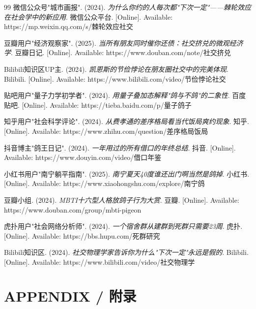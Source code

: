\documentclass[journal]{IEEEtran}
\begin{document}
\begin{thebibliography}{99}
 微信公众号"城市画报". (2024). \textit{为什么你约的人每次都"下次一定"——棘轮效应在社会学中的新应用}. 微信公众平台. [Online]. Available: https://mp.weixin.qq.com/s/棘轮效应社交

 豆瓣用户"经济观察家". (2025). \textit{当所有朋友同时催你还债：社交挤兑的微观经济学}. 豆瓣日记. [Online]. Available: https://www.douban.com/note/社交挤兑

 Bilibili知识区UP主. (2024). \textit{凯恩斯的节俭悖论在朋友圈社交中的完美体现}. Bilibili. [Online]. Available: https://www.bilibili.com/video/节俭悖论社交

 贴吧用户"量子力学初学者". (2024). \textit{用量子叠加态解释"鸽与不鸽"的二象性}. 百度贴吧. [Online]. Available: https://tieba.baidu.com/p/量子鸽子

 知乎用户"社会科学评论". (2024). \textit{从费孝通的差序格局看当代饭局爽约现象}. 知乎. [Online]. Available: https://www.zhihu.com/question/差序格局饭局

 抖音博主"鸽王日记". (2024). \textit{一年用过的所有借口的年终总结}. 抖音. [Online]. Available: https://www.douyin.com/video/借口年鉴

 小红书用户"南宁躺平指南". (2025). \textit{南宁夏天40度谁还出门啊当然是鸽掉}. 小红书. [Online]. Available: https://www.xiaohongshu.com/explore/南宁鸽

 豆瓣小组. (2024). \textit{MBTI十六型人格放鸽子行为大赏}. 豆瓣. [Online]. Available: https://www.douban.com/group/mbti-pigeon

 虎扑用户"社会网络分析师". (2024). \textit{一个宿舍群从建群到死群只需要23周}. 虎扑. [Online]. Available: https://bbs.hupu.com/死群研究

 Bilibili知识区. (2024). \textit{社交物理学家告诉你为什么"下次一定"永远是假的}. Bilibili. [Online]. Available: https://www.bilibili.com/video/社交物理学

\end{thebibliography}

\appendix
\section*{APPENDIX / 附录}
\label{sec:appendix}
\end{document}

